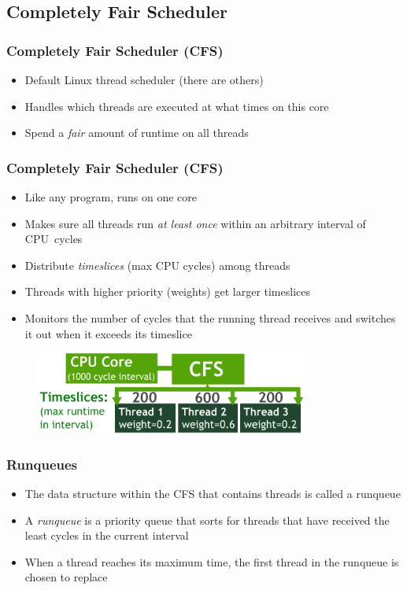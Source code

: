 \documentclass{beamer}
\newcommand{\linespace}{\vskip 0.25cm}
\begin{document}
\subsection[CFS]{Completely Fair Scheduler}
\begin{frame}
\frametitle{Completely Fair Scheduler (CFS)}

\begin{itemize}
\item Default Linux thread scheduler (there are others)
\item Handles which threads are executed at what times on this core
\item Spend a \emph{fair} amount of runtime on all threads
\end{itemize}

\end{frame}


\begin{frame}
\frametitle{Completely Fair Scheduler (CFS)}

\begin{itemize}
\item Like any program, runs on one core
\item Makes sure all threads run \emph{at least once} within an arbitrary interval of CPU~cycles
\item Distribute \emph{timeslices} (max CPU cycles) among threads
\item Threads with higher priority (weights) get larger timeslices
\item Monitors the number of cycles that the running thread receives and switches it out when it exceeds its timeslice
\end{itemize}

\begin{figure}
		\includegraphics[width=0.8\textwidth]{Illustrations/CFS}
		\label{fig:cfs}
\end{figure}

\linespace

\end{frame}

\begin{frame}
\frametitle{Runqueues}

\begin{itemize}
	\item The data structure within the CFS that contains threads is called a runqueue
	\item A \emph{runqueue} is a priority queue that sorts for threads that have received the least cycles in the current interval
	\item When a thread reaches its maximum time, the first thread in the runqueue is chosen to replace
\end{itemize}

\end{frame}
\end{document}
